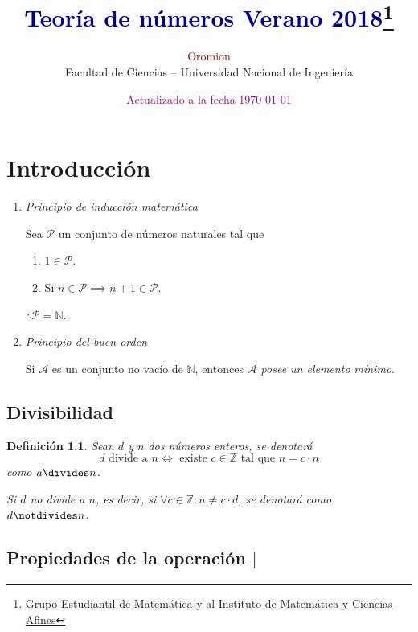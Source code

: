 \documentclass[oneside,a5paper]{memoir}
\author{\textcolor{DarkRed}{Oromion}\\
	Facultad de Ciencias -- Universidad Nacional de Ingeniería}
\title{\textcolor{DarkBlue}{Teoría de números Verano 2018}\thanks{\href{https://web.facebook.com/GEMFCUNI/}{Grupo Estudiantil de Matemática} y al \href{http://imca.edu.pe/portal/index.php/es/}{Instituto de Matemática y Ciencias Afines}}}
\date{\textcolor{DarkMagenta}{Actualizado a la fecha \today}}
\newtheorem{definition}{Definición}[chapter] %
\begin{document}
\maketitle

\chapter{Introducción}%

\begin{enumerate}[font={\bfseries},label={\roman*.}]
\item\label{pr:1} \emph{Principio de inducción matemática}
	
Sea $\mathcal{P}$ un conjunto de números naturales tal que

\begin{enumerate}
	\item $1\in\mathcal{P}$.
	\item Si $n\in\mathcal{P}\implies n+1\in\mathcal{P}$.
\end{enumerate}
$\therefore \boxed{\mathcal{P}=\mathbb{N}}$.
\item\label{pr:2} \emph{Principio del buen orden}

Si $\mathcal{A}$ es un conjunto no vacío de $\mathbb{N}$, entonces \emph{$\mathcal{A}$ posee un elemento mínimo}.
\end{enumerate}

\section{Divisibilidad}

\begin{definition}\label{def:1.1}
Sean $d$ y $n$ dos números enteros, se denotará
\[\boxed{d\text{ divide a }n\iff\text{ existe }c\in\mathbb{Z}\text{ tal que }n=c\cdot n}\]
como $a\divides n$.

\noindent
Si $d$ no divide a $n$, es decir, si $\forall c\in\mathbb{Z}\colon n\neq c\cdot d$, se denotará como $d\notdivides n$.
\end{definition}

\section{Propiedades de la operación $|$}
\end{document}
